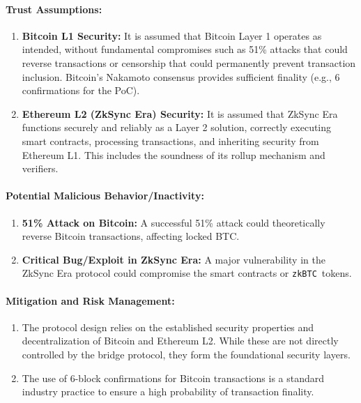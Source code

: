 \documentclass{DESSThesis}
\newcommand{\zktoken}{\texttt{zkBTC}}
\begin{document}
\paragraph{Trust Assumptions:}
\begin{enumerate}
\item \textbf{Bitcoin L1 Security:} It is assumed that Bitcoin Layer 1 operates as intended, without fundamental compromises such as 51\% attacks that could reverse transactions or censorship that could permanently prevent transaction inclusion. Bitcoin's Nakamoto consensus provides sufficient finality (e.g., 6 confirmations for the PoC).
\item \textbf{Ethereum L2 (ZkSync Era) Security:} It is assumed that ZkSync Era functions securely and reliably as a Layer 2 solution, correctly executing smart contracts, processing transactions, and inheriting security from Ethereum L1. This includes the soundness of its rollup mechanism and verifiers.
\end{enumerate}

\paragraph{Potential Malicious Behavior/Inactivity:}
\begin{enumerate}
\item \textbf{51\% Attack on Bitcoin:} A successful 51\% attack could theoretically reverse Bitcoin transactions, affecting locked BTC.
\item \textbf{Critical Bug/Exploit in ZkSync Era:} A major vulnerability in the ZkSync Era protocol could compromise the smart contracts or \zktoken\ tokens.
\end{enumerate}

\paragraph{Mitigation and Risk Management:}
\begin{enumerate}
\item The protocol design relies on the established security properties and decentralization of Bitcoin and Ethereum L2. While these are not directly controlled by the bridge protocol, they form the foundational security layers.
\item The use of 6-block confirmations for Bitcoin transactions is a standard industry practice to ensure a high probability of transaction finality.
\end{enumerate}
\end{document}
